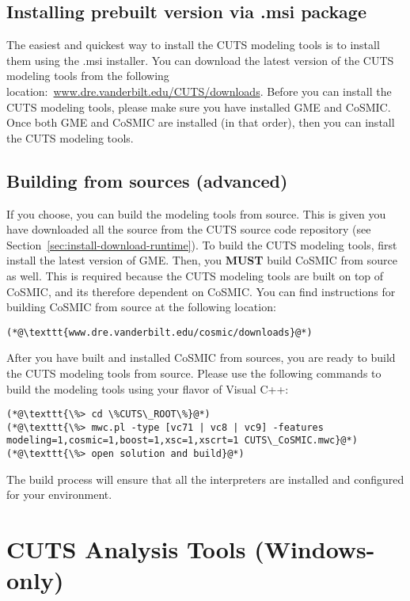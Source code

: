 \subsection{Installing prebuilt version via .msi package}

The easiest and quickest way to install the CUTS modeling tools is to install
them using the .msi installer. You can download the latest version of the 
CUTS modeling tools from the following location:~\url{www.dre.vanderbilt.edu/CUTS/downloads}.
Before you can install the CUTS modeling tools, please make sure you have
installed GME and CoSMIC. Once both GME and CoSMIC are installed (in that
order), then you can install the CUTS modeling tools.

\subsection{Building from sources (advanced)}

If you choose, you can build the modeling tools from source. This is given you
have downloaded all the source from the CUTS source code repository (see 
Section~\ref{sec:install-download-runtime}). To build the CUTS modeling tools,
first install the latest version of GME. Then, you \textbf{MUST} build CoSMIC
from source as well. This is required because the CUTS modeling tools are
built on top of CoSMIC, and its therefore dependent on CoSMIC. You can find
instructions for building CoSMIC from source at the following location:
\begin{lstlisting}
(*@\texttt{www.dre.vanderbilt.edu/cosmic/downloads}@*)
\end{lstlisting}
After you have built and installed CoSMIC from sources, you are ready to build
the CUTS modeling tools from source. Please use the following commands to 
build the modeling tools using your flavor of Visual C++:
\begin{lstlisting}
(*@\texttt{\%> cd \%CUTS\_ROOT\%}@*)
(*@\texttt{\%> mwc.pl -type [vc71 | vc8 | vc9] -features modeling=1,cosmic=1,boost=1,xsc=1,xscrt=1 CUTS\_CoSMIC.mwc}@*)
(*@\texttt{\%> open solution and build}@*)
\end{lstlisting}
The build process will ensure that all the interpreters are installed
and configured for your environment.

\section{CUTS Analysis Tools (Windows-only)}

